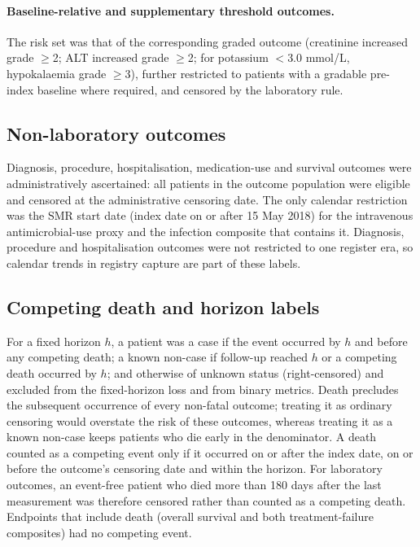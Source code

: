 \documentclass[10pt]{article}
\begin{document}
\paragraph{Baseline-relative and supplementary threshold outcomes.} The risk set was that of
the corresponding graded outcome (creatinine increased grade $\ge$2; ALT
increased grade $\ge$2; for potassium $<$3.0 mmol/L, hypokalaemia grade
$\ge$3), further restricted to patients with a gradable pre-index baseline
where required, and censored by the laboratory rule.

\subsection{Non-laboratory outcomes}
Diagnosis, procedure, hospitalisation, medication-use and survival outcomes
were administratively ascertained: all patients in the outcome population were
eligible and censored at the administrative censoring date. The only calendar
restriction was the SMR start date (index date on or after 15 May 2018) for
the intravenous antimicrobial-use proxy and the infection composite that
contains it. Diagnosis, procedure and hospitalisation outcomes were not
restricted to one register era, so calendar trends in registry capture are part
of these labels.

\subsection{Competing death and horizon labels}
For a fixed horizon $h$, a patient was a case if the event occurred by $h$ and
before any competing death; a known non-case if follow-up reached $h$ or a
competing death occurred by $h$; and otherwise of unknown status
(right-censored) and excluded from the fixed-horizon loss and from binary
metrics. Death precludes the subsequent occurrence of every non-fatal outcome;
treating it as ordinary censoring would overstate the risk of these outcomes,
whereas treating it as a known non-case keeps patients who die early in the
denominator. A death counted as a competing event only if it occurred on or
after the index date, on or before the outcome's censoring date and within
the horizon. For laboratory outcomes, an event-free patient who died more than
180 days after the last measurement was therefore censored rather than
counted as a competing death. Endpoints that include death (overall survival
and both treatment-failure composites) had no competing event.

\end{document}
